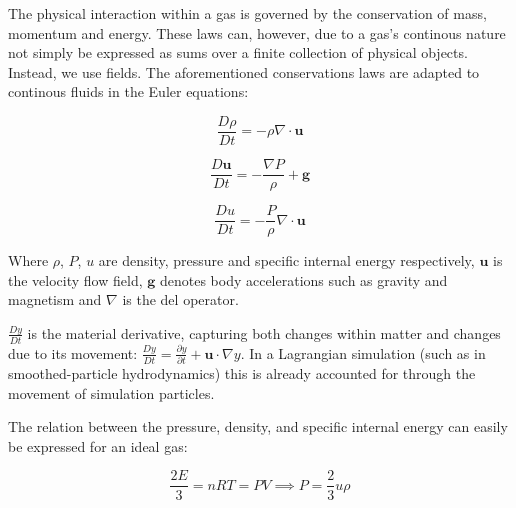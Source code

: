 \documentclass[../main.tex]{subfiles}
\begin{document}
The physical interaction within a gas is governed by the conservation of mass, momentum and energy.
These laws can, however, due to a gas's continous nature not simply be expressed as sums over a
finite collection of physical objects. Instead, we use fields. The aforementioned conservations laws
are adapted to continous fluids in the Euler equations: \autocite{wikipedia_euler_equations}

\begin{equation}
    \frac{D\rho}{Dt}
    = - \rho \nabla \cdot \mathbf{u}
\end{equation}

\begin{equation}
    \frac{D\mathbf{u}}{Dt}
    = - \frac{\nabla P}{\rho} + \mathbf{g}
\end{equation}

\begin{equation}
    \frac{Du}{Dt}
    = - \frac{P}{\rho} \nabla \cdot \mathbf{u}
\end{equation}

Where $\rho$, $P$, $u$ are density, pressure and specific internal energy respectively,
$\mathbf{u}$ is the velocity flow field, $\mathbf{g}$ denotes body accelerations such as gravity
and magnetism and $\nabla$ is the del operator.

$\frac{Dy}{Dt}$ is the material derivative, capturing both changes within matter and changes due to its
movement: $\frac{Dy}{Dt} = \frac{\partial y}{\partial t} + \mathbf{u} \cdot \nabla y$. In a
Lagrangian simulation (such as in smoothed-particle hydrodynamics) this is already accounted for
through the movement of simulation particles.

The relation between the pressure, density, and specific internal energy can easily be expressed for
an ideal gas:

\begin{equation}
    \frac{2E}{3} = nRT = PV \implies P = \frac{2}{3} u \rho
\end{equation}
\end{document}
